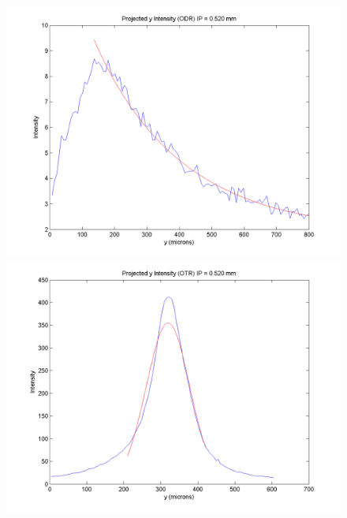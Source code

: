 \documentclass[12pt]{article}
\begin{document}
\begin{figure}
\begin{center}
\includegraphics[scale=0.5]{Figures/ProjY_ODR_520.PNG}
\includegraphics[scale=0.5]{Figures/ProjY_OTR_520.PNG}
\caption{}
\end{center}
\end{figure}
\end{document}
